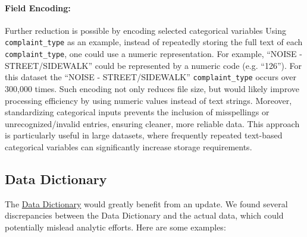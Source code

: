 \documentclass[linenumber]{jdsart}
\begin{document}
\paragraph{Field Encoding:} Further reduction is possible 
by encoding selected categorical variables 
Using \texttt{complaint\_type} as an example,
instead of repeatedly storing the full text of each \texttt{complaint\_type}, 
one could use a numeric representation. For example, 
``NOISE - STREET/SIDEWALK'' could be represented by a 
numeric code (e.g. ``126''). For this dataset the 
``NOISE - STREET/SIDEWALK'' \texttt{complaint\_type} occurs 
over 300,000 times. Such encoding not only reduces file 
size, but would likely improve processing efficiency by using numeric
values instead of text strings. Moreover, standardizing 
categorical inputs prevents the inclusion of misspellings 
or unrecognized/invalid entries, ensuring cleaner, more reliable 
data. This approach is particularly useful in large datasets, where 
frequently repeated text\mbox{-}based categorical variables can 
significantly increase storage requirements. 

\subsection{Data Dictionary} 
\label{sec:datadictionary}
The \href{https://data.cityofnewyork.us/api/views/erm2-nwe9/files/b372b884-f86a-453b-ba16-1fe06ce9d212?download=true&filename=311_ServiceRequest_2010-Present_DataDictionary_Updated_2023.xlsx}{Data Dictionary} would greatly benefit from an update. We found several 
discrepancies between the Data Dictionary and the actual data, which 
could potentially mislead analytic efforts. Here are some examples:
\end{document}
